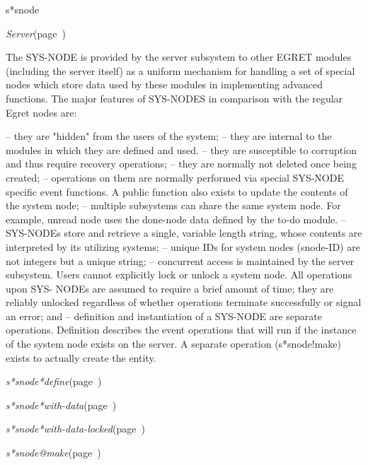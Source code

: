 \begin{description}
\item [Name:]  s*snode

\item [Layer:]
{\sl Server}\hfill(page~\pageref{Server})

\item [Description:]

The SYS-NODE is provided by the server subsystem to other EGRET modules
(including the server itself) as a uniform mechanism for handling a set
of special nodes which store data used by these modules in implementing
advanced functions. The major features of SYS-NODES in comparison with
the regular Egret nodes are:

 -- they are "hidden" from the users of the system;
 -- they are internal to the modules in which they are defined and used.
 -- they are susceptible to corruption and thus require recovery 
    operations;
 -- they are normally not deleted once being created; 
 -- operations on them are normally performed via special SYS-NODE
    specific event functions. A public function also exists to
    update the contents of the system node; 
 -- multiple subsystems can share the same system node. For example,
    unread node uses the done-node data defined by the to-do module.
 -- SYS-NODEs store and retrieve a single, variable length string,
    whose contents are interpreted by its utilizing systems; 
 -- unique IDs for system nodes (snode-ID) are not integers but a unique
    string; 
 -- concurrent access is maintained by the server subsystem. Users cannot
    explicitly lock or unlock a system node. All operations upon SYS-
    NODEs are assumed to require a brief amount of time; they are 
    reliably unlocked regardless of whether operations terminate 
    successfully or signal an error; and 
 -- definition and instantiation of a SYS-NODE are separate
    operations. Definition describes the event operations that will 
    run if the instance of the system node exists on the server. A 
    separate operation (s*snode!make) exists to actually create the entity.
\item [Attributes:]

\item [Operations:]
\item {\sl s*snode*define}\hfill(page~\pageref{s*snode*define})
\item {\sl s*snode*with-data}\hfill(page~\pageref{s*snode*with-data})
\item {\sl s*snode*with-data-locked}\hfill(page~\pageref{s*snode*with-data-locked})

\item {\sl s*snode@make}\hfill(page~\pageref{s*snode@make})

\item [Collections:]


\item [Subclasses:]


\item [Superclasses:]


\item [Instances:]



\end{description}
\horizontalline

